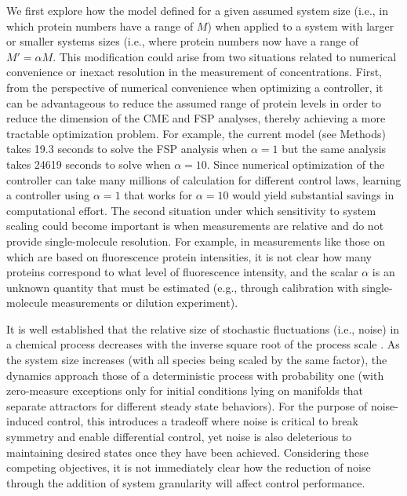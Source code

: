\documentclass[12pt]{article}
\begin{document}
We first explore how the model defined for a given assumed system size (i.e., in which protein numbers have a range of $M$) when applied to a system with larger or smaller systems sizes (i.e., where protein numbers now have a range of $M' = \alpha M$.  This modification could arise from two situations related to numerical convenience or inexact resolution in the measurement of concentrations. First, from the perspective of numerical convenience when optimizing a controller, it can be advantageous to reduce the assumed range of protein levels in order to reduce the dimension of the CME and FSP analyses, thereby achieving a more tractable optimization problem.  For example, the current model (see Methods) takes 19.3 seconds to solve the FSP analysis when $\alpha=1$ but the same analysis takes 24619 seconds to solve when $\alpha=10$. Since numerical optimization of the controller can take many millions of calculation for different control laws, learning a controller using $\alpha=1$ that works for $\alpha=10$ would yield substantial savings in computational effort. The second situation under which sensitivity to system scaling could become important is when measurements are relative and do not provide single-molecule resolution. For example, in measurements like those on \cite{Baumschlager} which are based on fluorescence protein intensities, it is not clear how many proteins correspond to what level of fluorescence intensity, and the scalar $\alpha$ is an unknown quantity that must be estimated (e.g., through calibration with single-molecule measurements or dilution experiment\cite{XXX - look for elowitz paper or something similar that tried to calibrate for single-molecule counts}). 

It is well established that the relative size of stochastic fluctuations (i.e., noise) in a chemical process decreases with the inverse square root of the process scale \cite{XXX van kampen? Gillespei look for this}. As the system size increases (with all species being scaled by the same factor), the dynamics approach those of a deterministic process with probability one (with zero-measure exceptions only for initial conditions lying on manifolds that separate attractors for different steady state behaviors)\cite{XXX}. For the purpose of noise-induced control, this introduces a tradeoff where noise is critical to break symmetry and enable differential control, yet noise is also deleterious to maintaining desired states once they have been achieved. Considering these competing objectives, it is not immediately clear how the reduction of noise through the addition of system granularity will affect control performance. 
\end{document}
